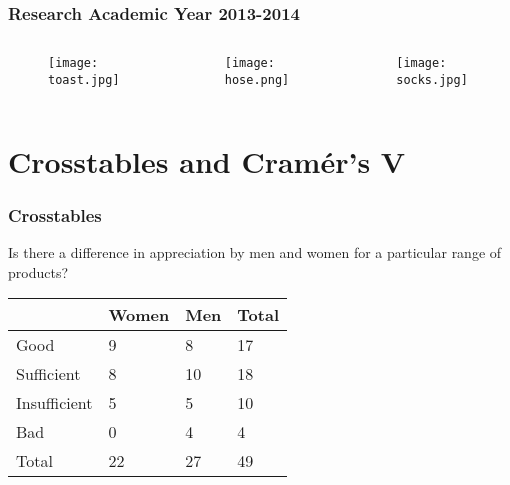 \documentclass[aspectratio=169]{beamer}
\begin{document}
\begin{frame}
  \frametitle{Research Academic Year 2013-2014}
  \begin{columns}
    \begin{column}{0.3\textwidth}
      
      \begin{figure}
        \centering
        \texttt{[image: toast.jpg]}
        \label{fig:toast}
      \end{figure}
      
    \end{column}
    \begin{column}{0.3\textwidth}
      
      \begin{figure}
        \centering
        \texttt{[image: hose.png]}
        \label{fig:hose}
      \end{figure}
      
    \end{column}
    \begin{column}{0.3\textwidth}
      
      \begin{figure}
        \centering
        \texttt{[image: socks.jpg]}
        \label{fig:socks}
      \end{figure}
      
    \end{column}
  \end{columns}
\end{frame}

\section{Crosstables and Cramér's V}

\begin{frame}
  \frametitle{Crosstables}
  Is there a difference in appreciation by men and women for a particular range of products?
  
  \begin{table}[h]
    \begin{tabular}{l||l|l||l}
                 & Women & Men &  Total \\ \hline \hline
            Good &     9 &   8 &     17 \\
      Sufficient &     8 &  10 &     18 \\
    Insufficient &     5 &   5 &     10 \\
             Bad &     0 &   4 &      4 \\ \hline \hline
           Total &    22 &  27 &     49 \\      
    \end{tabular}
  \end{table}
\end{frame}
\end{document}
